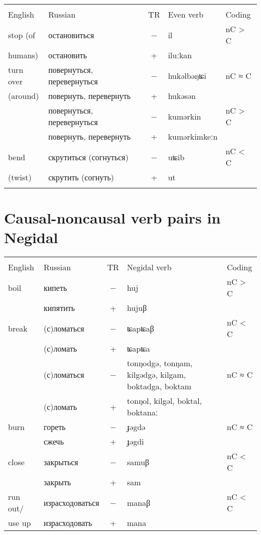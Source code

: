 \documentclass[output=paper,colorlinks,citecolor=brown]{langscibook}
\begin{document}
\begin{paperappendix}
\begin{table}[H]
\begin{tabular}{ l  l c l l}
\lsptoprule
\multicolumn{2}{c}{Verb meaning} & \\\cmidrule(lr){1-2}
English  & Russian &	TR &	Even verb &	Coding\\
\midrule
stop (of &	остановиться &	− &	il & 	nC > C\\
humans) &	остановить &	+ &	iluːkan	&\\
\midrule
turn over  &	повернуться, перевернуться &	− &	hukəlbəŋʨi &	nC ≈ C\\
 (around)&	повернуть, перевернуть &	+ &	hukəsən	&\\
 &	повернуться, перевернуться &	− &	kumərkin &	nC > C\\
 &	повернуть, перевернуть &	+ &	kumərkimkeːn &\\
\midrule
bend  &	скрутиться (согнуться) &	− &	uʨib &	nC < C\\
(twist) &	скрутить (согнуть) &	+ &	ut	&\\
  \lspbottomrule
\end{tabular}
\label{table:2Appendix1c}
\end{table}

\section{Causal-noncausal verb pairs in Negidal}\label{Appendix2}

\begin{table}[H]
\begin{tabularx}{\textwidth}{ l  l c Q l}
\lsptoprule
{} & \\\cmidrule(lr){1-2}
English  & Russian &	TR &	Negidal verb &	Coding\\
\midrule
boil &	кипеть &	− &	huj &	nC > C\\
&	кипятить &	+ &	hujuβ &\\
\midrule
break &	(с)ломаться &	− &	ʨapʨaβ &	nC < C\\
 &	(с)ломать &	+ &	ʨapʨa\\
 &	(с)ломаться &	− &	tonŋodgə, tonŋam, kilgədgə, kilgam, boktadga, boktam &	nC  ≈ C\\
 &	(с)ломать &	+ &	tonŋol, kilgəl, boktal, boktanaː &\\
\midrule
burn &	гореть &	− &	ɟəgdə &	nC ≈ C\\
 &	сжечь &	+ &	ɟəgdi &\\
\midrule
close &	закрыться &	− &	samuβ &	nC < C\\
 &	закрыть & 	+ &	sam &\\
\midrule
run out/ &	израсходоваться &	− &	manaβ &	nC < C\\
 use up &	израсходовать &	+ &	mana &\\


\end{tabularx}
\end{table}
\end{paperappendix}
\end{document}
